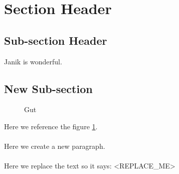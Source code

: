 \section{Section Header}

\subsection{Sub-section Header}

Janik is wonderful.

\subsection{New Sub-section}

\begin{figure}[ht!]
\centering
{}
\caption{Gut}
\label{fig:reference-for-fig}
\end{figure}
\noindent
Here we reference the figure \ref{fig:reference-for-fig}. \\ \\
Here we create a new paragraph. \\ \\
Here we replace the text so it says: <REPLACE_ME>